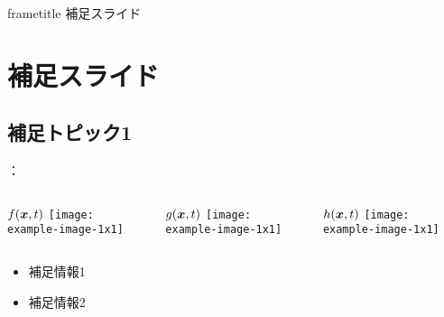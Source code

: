\documentclass[12pt,dvipdfmx,svgnames,uplatex,aspectratio=169]{beamer}
\begin{document}
\backupbegin
\appendix

\begin{frame}
  \centering
  \begin{beamercolorbox}[wd=\textwidth, center, sep=2pt, rounded=true, shadow=false]{frametitle}
    補足スライド
  \end{beamercolorbox}
\end{frame}


\section{補足スライド}
\subsection{補足トピック1}
\begin{frame}{\insertsection：\insertsubsection}
  \begin{columns}[T]
    \begin{column}{0.33\textwidth}
      \begin{block}{\(f(\vb*{x},t)\)}
        \centering
        \texttt{[image: example-image-1x1]}
      \end{block}
    \end{column}
    \begin{column}{0.33\textwidth}
      \begin{block}{\(g(\vb*{x},t)\)}
        \centering
        \texttt{[image: example-image-1x1]}
      \end{block}
    \end{column}
    \begin{column}{0.33\textwidth}
      \begin{block}{\(h(\vb*{x},t)\)}
        \centering
        \texttt{[image: example-image-1x1]}
      \end{block}
    \end{column}
  \end{columns}

  \begin{itemize}
    \item 補足情報1
    \item 補足情報2
  \end{itemize}
\end{frame}

\backupend
\end{document}
